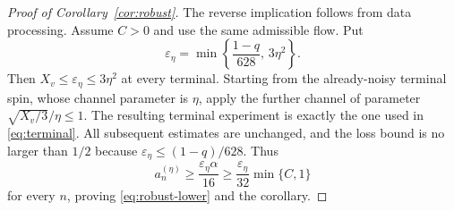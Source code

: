 \begin{proof}[Proof of Corollary~\ref{cor:robust}]
The reverse implication follows from data processing. Assume $C>0$ and use
the same admissible flow. Put
\[
 \varepsilon_\eta
 =\min\left\{\frac{1-q}{628},\,3\eta^2\right\}.
\]
Then $X_v\le\varepsilon_\eta\le3\eta^2$ at every terminal. Starting
from the already-noisy terminal spin, whose channel parameter is $\eta$,
apply the further channel of parameter
$\sqrt{X_v/3}/\eta\le1$. The resulting terminal experiment is exactly
the one used in \eqref{eq:terminal}. All subsequent estimates are unchanged,
and the loss bound is no larger than $1/2$ because
$\varepsilon_\eta\le(1-q)/628$. Thus
\[
 a_n^{(\eta)}\ge\frac{\varepsilon_\eta\alpha}{16}
 \ge\frac{\varepsilon_\eta}{32}\min\{C,1\}
\]
for every $n$, proving \eqref{eq:robust-lower} and the corollary.
\end{proof}
